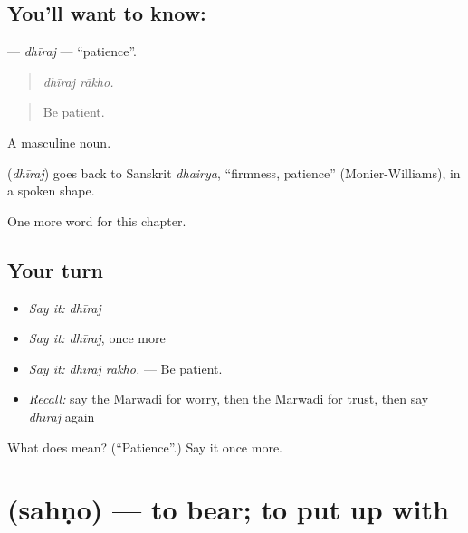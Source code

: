 \subsection*{You'll want to know: }
\textbf{} — \emph{dhīraj} — \textquotedblleft{}patience\textquotedblright{}.

\begin{quote}
 
\end{quote}

\begin{quote}
\emph{dhīraj rākho.}
\end{quote}

\begin{quote}
Be patient.
\end{quote}

A masculine noun.

\begin{cousinweb}
\textbf{} (\emph{dhīraj}) goes back to Sanskrit \emph{dhairya}, \textquotedblleft{}firmness, patience\textquotedblright{} (Monier-Williams), in a spoken shape.
\end{cousinweb}

\begin{grammarlens}[title={What you've built}]
One more word for this chapter.
\end{grammarlens}

\subsection*{Your turn}
\begin{itemize}
\raggedright
  \item \emph{Say it:} \emph{dhīraj}
  \item \emph{Say it:} \emph{dhīraj}, once more
  \item \emph{Say it:} \emph{dhīraj rākho.} — Be patient.
  \item \emph{Recall:} say the Marwadi for worry, then the Marwadi for trust, then say \emph{dhīraj} again
\end{itemize}

\begin{tcolorbox}[breakable,colback=teal!4,colframe=teal!35!black,title={Before you move on}]
What does  mean? (\textquotedblleft{}Patience\textquotedblright{}.) Say it once more.
\end{tcolorbox}
\section[\texorpdfstring{\mw{सहणो} (sahṇo)}{सहणो (sahṇo)}]{ (sahṇo) — to bear; to put up with}


